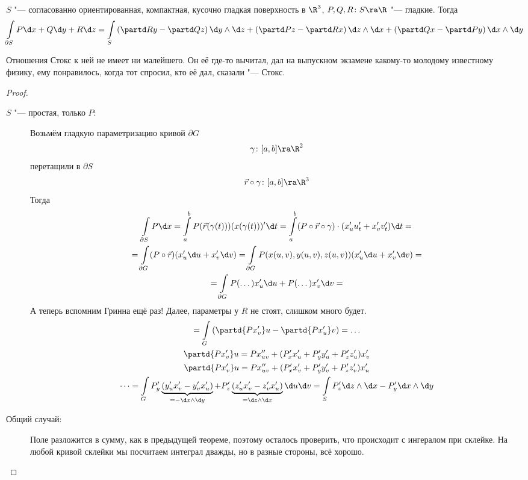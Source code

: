 \begin{theorem}
	$S$ "--- согласованно ориентированная, компактная, кусочно гладкая поверхность в $\R^3$,
	$P, Q, R\colon S \ra \R$ "--- гладкие.
	Тогда
	\[
		\int\limits_{\partial S} P \d x + Q \d y + R \d z
		= \int\limits_S \left(\partd Ry - \partd Qz\right) \d y \wedge \d z + \left(\partd Pz - \partd Rx\right) \d z \wedge \d x + \left(\partd Qx - \partd Py\right) \d x \wedge \d y
	\]
\end{theorem}
\begin{Rem}
	Отношения Стокс к ней не имеет ни малейшего.
	Он её где-то вычитал, дал на выпускном экзамене какому-то молодому известному физику, ему понравилось,
	когда тот спросил, кто её дал, сказали "--- Стокс.
\end{Rem}
\begin{proof}\begin{description}
\item[$S$ "--- простая, только $P$:]
	Возьмём гладкую параметризацию кривой $\partial G$
	\[ \gamma \colon [a, b] \ra \R^2 \]
	перетащили в $\partial S$
	\[ \vec r \circ \gamma\colon [a, b] \ra \R^3 \]
	Тогда
	\begin{gather*}
		\int\limits_{\partial S} P \d x
		= \int\limits_a^b P(\vec r(\gamma(t))) (x(\gamma(t)))' \d t
		= \int\limits_a^b (P \circ \vec r \circ \gamma) \cdot (x_u' u_t' + x_v' v_t') \d t = \\
		= \int\limits_{\partial G} (P \circ \vec r) (x_u' \d u + x_v' \d v)
		= \int\limits_{\partial G} P(x(u, v), y(u, v), z(u, v)) (x_u' \d u + x_v' \d v) = \\
		= \int\limits_{\partial G} P(\dots) x_u' \d u + P(\dots) x_v' \d v = 
	\end{gather*}
	А теперь вспомним Гринна ещё раз! Далее, параметры у $R$ не стоят, слишком много будет.
	\begin{gather*}
		= \int\limits_G \left( \partd{P x_v'}u - \partd{P x_u'}v\right) = \dots \\
		\partd{P x_v'}u = P x_{uv}'' + (P_x' x_u' + P_y' y_u' + P_z' z_u') x_v' \\
		\partd{P x_v'}u = P x_{uv}'' + (P_x' x_v' + P_y' y_v' + P_z' z_v') x_u' \\
		\dots
		= \int\limits_G P_y' \underbrace{(y_u' x_v' - y_v' x_u')}_{=-\d x \wedge \d y}
		              + P_z' \underbrace{(z_u' x_v' - z_v' x_u')}_{= \d z \wedge \d x} \d u \d v
		= \int\limits_S P_z' \d z \wedge \d x - P_y' \d x \wedge \d y
	\end{gather*}

\item[Общий случай:]
	Поле разложится в сумму, как в предыдущей теореме, поэтому осталось проверить, что происходит с ингералом при склейке.
	На любой кривой склейки мы посчитаем интеграл дважды, но в разные стороны, всё хорошо.
\end{description}\end{proof}

